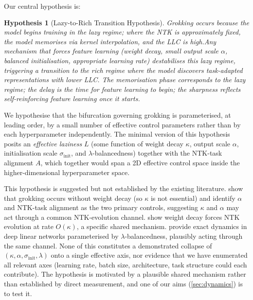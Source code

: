 \documentclass[11pt,a4paper]{article}
\newtheorem{hypothesis}{Hypothesis}
\begin{document}
Our central hypothesis is:

\begin{hypothesis}[Lazy-to-Rich Transition Hypothesis]
Grokking occurs because the model begins training in the lazy regime; where the NTK is approximately fixed, the model memorises via kernel interpolation, and the LLC is high.Any mechanism that forces feature learning (weight decay, small output scale $\alpha$, balanced initialisation, appropriate learning rate) destabilises this lazy regime, triggering a transition to the rich regime where the model discovers task-adapted representations with lower LLC. The memorisation phase corresponds to the lazy regime; the delay is the time for feature learning to begin; the sharpness reflects self-reinforcing feature learning once it starts.
\end{hypothesis}

We hypothesise that the bifurcation governing grokking is parameterised, at leading order, by a small number of effective control parameters rather than by each hyperparameter independently. The minimal version of this hypothesis posits an \emph{effective laziness} $L$ (some function of weight decay $\kappa$, output scale $\alpha$, initialisation scale $\sigma_{\mathrm{init}}$, and $\lambda$-balancedness) together with the NTK-task alignment $A$, which together would span a 2D effective control space inside the higher-dimensional hyperparameter space.

This hypothesis is suggested but not established by the existing literature. \citet{kumar2024grokking} show that grokking occurs without weight decay (so $\kappa$ is not essential) and identify $\alpha$ and NTK-task alignment as the two primary controls, suggesting $\kappa$ and $\alpha$ may act through a common NTK-evolution channel. \citet{lewkowycz2020large} show weight decay forces NTK evolution at rate $O(\kappa)$, a specific shared mechanism. \citet{domine2025lazy} provide exact dynamics in deep linear networks parameterised by $\lambda$-balancedness, plausibly acting through the same channel. None of this constitutes a demonstrated collapse of $(\kappa, \alpha, \sigma_{\mathrm{init}}, \lambda)$ onto a single effective axis, nor evidence that we have enumerated all relevant axes (learning rate, batch size, architecture, task structure could each contribute). The hypothesis is motivated by a plausible shared mechanism rather than established by direct measurement, and one of our aims (\cref{sec:dynamics}) is to test it.

\end{document}
